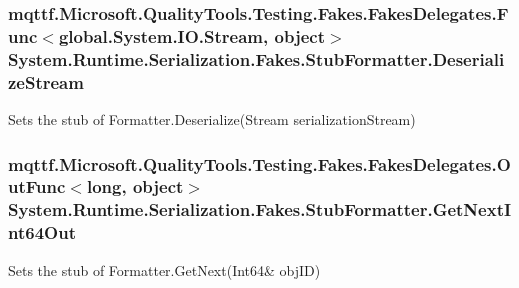 \hypertarget{class_system_1_1_runtime_1_1_serialization_1_1_fakes_1_1_stub_formatter_a1029aa68de234625cf7987eddc1097c7}{
\subsubsection[{Deserialize\-Stream}]{\setlength{\rightskip}{0pt plus 5cm}mqttf.\-Microsoft.\-Quality\-Tools.\-Testing.\-Fakes.\-Fakes\-Delegates.\-Func$<$global.\-System.\-I\-O.\-Stream, object$>$ System.\-Runtime.\-Serialization.\-Fakes.\-Stub\-Formatter.\-Deserialize\-Stream}}\label{class_system_1_1_runtime_1_1_serialization_1_1_fakes_1_1_stub_formatter_a1029aa68de234625cf7987eddc1097c7}


Sets the stub of Formatter.\-Deserialize(\-Stream serialization\-Stream)

\hypertarget{class_system_1_1_runtime_1_1_serialization_1_1_fakes_1_1_stub_formatter_a8cbd900aacf966310ba11000f7c84ecc}{
\subsubsection[{Get\-Next\-Int64\-Out}]{\setlength{\rightskip}{0pt plus 5cm}mqttf.\-Microsoft.\-Quality\-Tools.\-Testing.\-Fakes.\-Fakes\-Delegates.\-Out\-Func$<$long, object$>$ System.\-Runtime.\-Serialization.\-Fakes.\-Stub\-Formatter.\-Get\-Next\-Int64\-Out}}\label{class_system_1_1_runtime_1_1_serialization_1_1_fakes_1_1_stub_formatter_a8cbd900aacf966310ba11000f7c84ecc}


Sets the stub of Formatter.\-Get\-Next(Int64\& obj\-I\-D)

